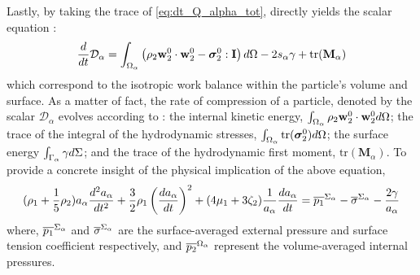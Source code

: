 Lastly, by taking the trace of \ref{eq:dt_Q_alpha_tot}, directly yields the scalar equation :
\begin{equation}
    \frac{d}{d t} {\mathcal{D}_\alpha}
    = \int_{\Omega_\alpha}  \left(
        \rho_2 \textbf{w}_2^0 \cdot \textbf{w}_2^0
        - \bm{\sigma}_2^0 : \textbf{I}
        \right)  d\Omega
        - 2 s_\alpha \gamma
        + \text{tr}(\textbf{M}_\alpha)
    \label{eq:dt_D_alpha}
\end{equation}
which correspond to the isotropic work balance within the particle's volume and surface. 
As a matter of fact, the rate of compression of a particle, denoted by the scalar $\mathcal{D}_\alpha$ evolves according to : 
the internal kinetic energy, $\int_{\Omega_\alpha} \rho_2 \textbf{w}_2^0 \cdot \textbf{w}_2^0  d\Omega$;
the trace of the integral of the hydrodynamic stresses, $\int_{\Omega_\alpha}  \text{tr}(\bm{\sigma}_2^0) d\Omega$; 
the surface energy $\int_{\Gamma_\alpha}  \gamma  d\Sigma$; 
and the trace of the hydrodynamic first moment, $\text{tr}(\textbf{M}_\alpha)$.
To provide a concrete insight of the physical implication of the above equation, 
\begin{equation*}
    (\rho_1 + \frac{1}{5}\rho_2)a_\alpha\frac{d^2 a_\alpha}{dt^2}
    + \frac{3}{2}\rho_1\left(\frac{d a_\alpha}{dt}\right)^2
    + (4\mu_1 + 3\zeta_2) \frac{1}{a_\alpha}\frac{d a_\alpha}{dt}
    = \overline{p_1}^{\Sigma_\alpha} - \overline{\sigma}^{\Sigma_\alpha} - \frac{2\gamma}{a_\alpha}
\end{equation*}
where,  $\overline{p_1}^{\Sigma_\alpha}$ and  $\overline{\sigma}^{\Sigma_\alpha}$ are the surface-averaged external pressure and surface tension coefficient respectively, and $\overline{p_2}^{\Omega_\alpha}$ represent the volume-averaged internal pressures.
